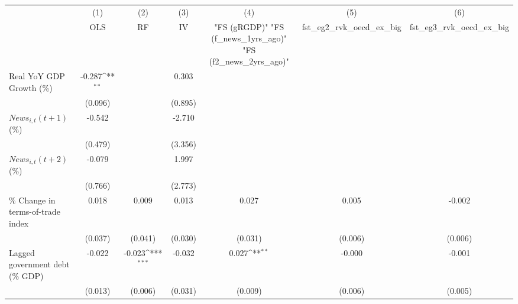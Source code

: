 {
\def\sym#1{\ifmmode^{#1}\else\(^{#1}\)\fi}
\begin{tabular}{l*{6}{c}}
\toprule
                    &\multicolumn{1}{c}{(1)}&\multicolumn{1}{c}{(2)}&\multicolumn{1}{c}{(3)}&\multicolumn{1}{c}{(4)}&\multicolumn{1}{c}{(5)}&\multicolumn{1}{c}{(6)}\\
                    &\multicolumn{1}{c}{OLS}&\multicolumn{1}{c}{RF}&\multicolumn{1}{c}{IV}&\multicolumn{1}{c}{ "FS (gRGDP)"  "FS (f_news_1yrs_ago)"  "FS (f2_news_2yrs_ago)" }&\multicolumn{1}{c}{fst_eg2_rvk_oecd_ex_big}&\multicolumn{1}{c}{fst_eg3_rvk_oecd_ex_big}\\
\midrule
Real YoY GDP Growth (\%)&      -0.287\sym{**} &                     &       0.303         &                     &                     &                     \\
                    &     (0.096)         &                     &     (0.895)         &                     &                     &                     \\
\addlinespace
$ News_{i,t}(t+1)$ (\%)&      -0.542         &                     &      -2.710         &                     &                     &                     \\
                    &     (0.479)         &                     &     (3.356)         &                     &                     &                     \\
\addlinespace
$ News_{i,t}(t+2)$ (\%)&      -0.079         &                     &       1.997         &                     &                     &                     \\
                    &     (0.766)         &                     &     (2.773)         &                     &                     &                     \\
\addlinespace
\% Change in terms-of-trade index&       0.018         &       0.009         &       0.013         &       0.027         &       0.005         &      -0.002         \\
                    &     (0.037)         &     (0.041)         &     (0.030)         &     (0.031)         &     (0.006)         &     (0.006)         \\
\addlinespace
Lagged government debt (\% GDP)&      -0.022         &      -0.023\sym{***}&      -0.032         &       0.027\sym{**} &      -0.000         &      -0.001         \\
                    &     (0.013)         &     (0.006)         &     (0.031)         &     (0.009)         &     (0.006)         &     (0.005)         \\

\end{tabular}}

